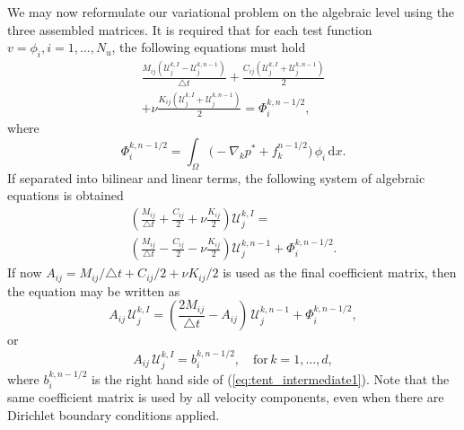 \documentclass[final,3p,times,twocolumn]{elsarticle}
\newcounter{bla}
\begin{document}
We may now reformulate our variational problem on the algebraic level using the three assembled matrices. It is required that for each test function $v=\phi_i, i=1, \ldots, N_u$, the following equations must hold 
\begin{multline}
 \frac{M_{ij}\left(\mathcal{U}_j^{k,I} - \mathcal{U}_j^{k, n-1}\right)}{\triangle t} + \frac{C_{ij}\left(\mathcal{U}_j^{k,I}+\mathcal{U}_j^{k, n-1}\right)}{2} \\ + \nu \frac{K_{ij}\left(\mathcal{U}_j^{k,I} +\mathcal{U}_j^{k, n-1}\right)}{2} = \Phi_i^{k, n-1/2},
\end{multline}
where
\begin{equation}
\Phi_i^{k, n-1/2} = \int_{\Omega} \Big (- \nabla_k p^{*} + f_k^{n-1/2} \Big) \, \phi_i \, \mathrm{d}x.
\end{equation}
If separated into bilinear and linear terms, the following system of algebraic equations is obtained
\begin{multline}
 \left(\frac{M_{ij}}{\triangle t} + \frac{C_{ij}}{2} + \nu\frac{K_{ij}}{2}\right) \mathcal{U}_j^{k,I} = \\
 \left(\frac{M_{ij}}{\triangle t} - \frac{C_{ij}}{2} - \nu\frac{K_{ij}}{2}\right) \mathcal{U}_j^{k, n-1}+\Phi_i^{k, n-1/2}. \label{eq:tent_algebraic}
\end{multline}
If now $A_{ij}= M_{ij}/\triangle t + C_{ij}/2 + \nu K_{ij}/2$ is used as the final coefficient matrix, then the equation may be written as
\begin{equation}
  A_{ij} \, \mathcal{U}_j^{k,I} = \left(\frac{2M_{ij}}{\triangle t} -A_{ij}\right)\, \mathcal{U}_j^{k,n-1} + \Phi_i^{k, n-1/2}, \label{eq:tent_intermediate1}
\end{equation}
or 
\begin{equation}
  A_{ij} \, \mathcal{U}_j^{k,I} = b_i^{k, n-1/2}, \quad \text{for}\, k= 1, \ldots, d, \label{eq:Au=b}
\end{equation}
where $b_i^{k, n-1/2}$ is the right hand side of (\ref{eq:tent_intermediate1}). Note that the same coefficient matrix is used by all velocity components, even when there are Dirichlet boundary conditions applied. 
\end{document}
